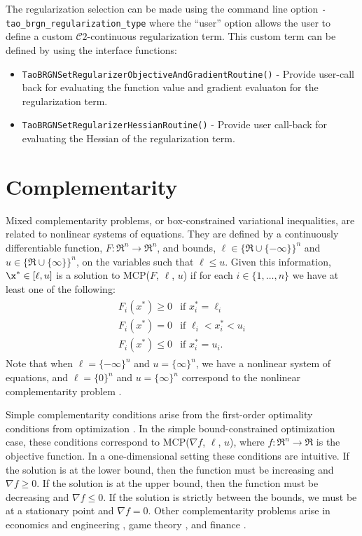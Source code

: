 The regularization selection can be made using the command line option \texttt{-tao\_brgn\_regularization\_type} 
{\tt <l2pure, l2prox, l1dict, user>} where the ``user'' option allows the user to define a custom 
$\mathcal{C}2$-continuous regularization term. This custom term can be defined by using the 
interface functions:
\begin{itemize} 
  \item {\tt TaoBRGNSetRegularizerObjectiveAndGradientRoutine()} - Provide user-call back for 
        evaluating the function value and gradient evaluaton for the regularization term.
  \item {\tt TaoBRGNSetRegularizerHessianRoutine()} - Provide user call-back for evaluating the 
        Hessian of the regularization term.
\end{itemize}

\section{Complementarity}
\label{sec:complementarity}

Mixed complementarity problems, or box-constrained variational inequalities,
are related to nonlinear systems of equations.  They are defined by a 
continuously differentiable function,
$F:\Re^n \to \Re^n$, and bounds, $\ell \in \{\Re \cup \{-\infty\}\}^n$ 
and $u \in \{\Re \cup \{\infty\}\}^n$, on the variables such that 
$\ell \leq u$.  Given this information, $\x^* \in [\ell,u]$ is a solution to 
MCP($F$, $\ell$, $u$) if for each $i \in \{1, \ldots, n\}$ we have at
least one of the following:
\begin{eqnarray*}
\begin{array}{ll}
F_i(x^*) \geq 0 & \mbox{if } x^*_i = \ell_i \\
F_i(x^*) = 0 & \mbox{if } \ell_i < x^*_i < u_i \\
F_i(x^*) \leq 0 & \mbox{if } x^*_i = u_i.
\end{array}
\end{eqnarray*}
Note that when $\ell = \{-\infty\}^n$ and $u = \{\infty\}^n$, we have a 
nonlinear system of equations, and $\ell = \{0\}^n$ and $u = \{\infty\}^n$ 
correspond to the nonlinear complementarity problem \cite{cottle:nonlinear}.

Simple complementarity conditions arise from the first-order optimality 
conditions from optimization \cite{karush:minima, kuhn.tucker:nonlinear}.  
In the simple bound-constrained optimization case, these conditions 
correspond to MCP($\nabla f$, $\ell$, $u$), where $f: \Re^n \to \Re$ 
is the objective function.  In a one-dimensional setting these conditions 
are intuitive.  If the solution is at the lower bound, then the function must 
be increasing and $\nabla f \geq 0$.  If the solution is at the 
upper bound, then the function must be decreasing and $\nabla f \leq 0$.  
If the solution 
is strictly between the bounds, we must be at a stationary point and 
$\nabla f = 0$.  Other complementarity problems arise in economics and 
engineering \cite{ferris.pang:engineering}, game 
theory \cite{nash:equilibrium}, and finance \cite{huang.pang:option}.

